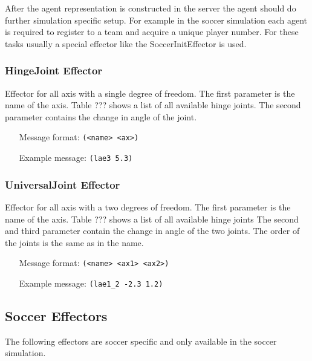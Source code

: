 After the agent representation is constructed in the server the agent
should do further simulation specific setup. For example in the soccer
simulation each agent is required to register to a team and acquire a
unique player number. For these tasks usually a special effector like
the SoccerInitEffector is used.


\subsubsection{HingeJoint Effector}
Effector for all axis with a single degree of freedom.
The first parameter is the name of the axis. Table ??? shows a list of all
available hinge joints. The second parameter contains the change in angle of
the joint.
\begin{itemize}
	\item[Message format:] \texttt{(<name> <ax>)}
	\item[Example message:] \texttt{(lae3 5.3)}
\end{itemize}

\subsubsection{UniversalJoint Effector}
Effector for all axis with a two degrees of freedom.
The first parameter is the name of the axis. Table ??? shows a list of all
available hinge joints
The second and third parameter contain the change in angle of the two joints.
The order of the joints is the same as in the name.
\begin{itemize}
	\item[Message format:] \texttt{(<name> <ax1> <ax2>)}
	\item[Example message:] \texttt{(lae1\_2 -2.3 1.2)}
\end{itemize}

\subsection{Soccer Effectors}
The following effectors are soccer specific and only available in the soccer
simulation.

